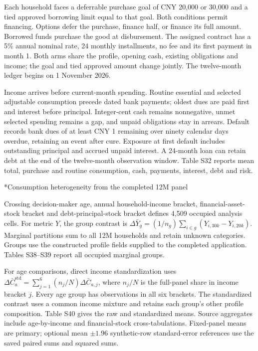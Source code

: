 \documentclass[10pt]{article}
\makeatletter
\renewcommand\subsection{\@startsection{subsection}{2}{\z@}{-1.7ex plus -.5ex minus -.2ex}{.6ex plus .2ex}{\normalfont\normalsize\mdseries}}
\makeatother
\begin{document}
Each household faces a deferrable purchase goal of CNY 20,000 or 30,000 and a tied approved borrowing limit equal to that goal. Both conditions permit financing. Options defer the purchase, finance half, or finance its full amount. Borrowed funds purchase the good at disbursement. The assigned contract has a 5\% annual nominal rate, 24 monthly installments, no fee and its first payment in month 1. Both arms share the profile, opening cash, existing obligations and income; the goal and tied approved amount change jointly. The twelve-month ledger begins on 1 November 2026.

Income arrives before current-month spending. Routine essential and selected adjustable consumption precede dated bank payments; oldest dues are paid first and interest before principal. Integer-cent cash remains nonnegative, unmet selected spending remains a gap, and unpaid obligations stay in arrears. Default records bank dues of at least CNY 1 remaining over ninety calendar days overdue, retaining an event after cure. Exposure at first default includes outstanding principal and accrued unpaid interest. A 24-month loan can retain debt at the end of the twelve-month observation window. Table S32 reports mean total, purchase and routine consumption, cash, payments, interest, debt and risk.


\subsection*{Consumption heterogeneity from the completed 12M panel}

Crossing decision-maker age, annual household-income bracket, financial-asset-stock bracket and debt-principal-stock bracket defines 4,509 occupied analysis cells. For metric $Y$, the group contrast is $\Delta\bar Y_g=(1/n_g)\sum_{i\in g}(Y_{i,30k}-Y_{i,20k})$. Marginal partitions sum to all 12M households and retain unknown categories. Groups use the constructed profile fields supplied to the completed application. Tables S38--S39 report all occupied marginal groups.

For age comparisons, direct income standardization uses $\Delta\bar C_a^{\mathrm{std}}=\sum_{j=1}^{6}(n_j/N)\Delta\bar C_{a,j}$, where $n_j/N$ is the full-panel share in income bracket $j$. Every age group has observations in all six brackets. The standardized contrast uses a common income mixture and retains each group's other profile composition. Table S40 gives the raw and standardized means. Source aggregates include age-by-income and financial-stock cross-tabulations. Fixed-panel means are primary; optional mean $\pm1.96$ synthetic-row standard-error references use the saved paired sums and squared sums.
\end{document}
